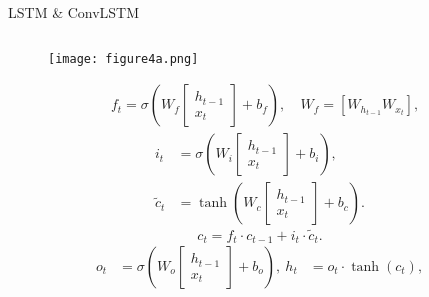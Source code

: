 \documentclass[10pt,aspectratio=169,dvipsnames]{beamer} %
\begin{document}
	\begin{frame}{LSTM \& ConvLSTM}
		\begin{columns}[T]
			\tiny
			\begin{column}[t]{0.5\textwidth}
				\begin{figure}[ht!]
					\centering
					\texttt{[image: figure4a.png]}
				\end{figure}
				\begin{tcolorbox}
					\begin{equation}
							\begin{aligned}
								&f_{t}=\sigma\left( W_{f}  
								\left[
								\begin{array}{c}
									h_{t-1} \\ x_{t}
								\end{array} 
								\right]
								+ b_{f} \right), \
								&W_{f} = \left[ W_{h_{t-1}}  W_{x_{t}} \right],
							\end{aligned}					
							\label{eq:eq1}
					\end{equation}				
					\begin{equation}
						\begin{aligned}
							i_{t} &=\sigma\left(W_{i} 
							\left[
							\begin{array}{c}
								h_{t-1} \\ x_{t}
							\end{array} 
							\right]+b_{i}\right), 
							\\ \tilde{c}_{t} &=\tanh \left(W_{c} 
							\left[
							\begin{array}{c}
								h_{t-1} \\ x_{t}
							\end{array} 
							\right]+b_{c}\right). 
						\end{aligned} \label{eq:eq2}
					\end{equation}
					\begin{equation}
						c_{t}=f_{t} \cdot c_{t-1}+i_{t} \cdot \tilde{c}_{t}.
						\label{eq:eq3}
					\end{equation}
					\begin{equation}
						\begin{aligned}
							o_{t} &=\sigma\left(W_{o} 
							\left[
							\begin{array}{c}
								h_{t-1} \\ x_{t}
							\end{array} 
							\right]
							+b_{o}\right), \
							h_{t} &=o_{t} \cdot \tanh \left(c_{t}\right),
						\end{aligned}

\end{equation}
\end{tcolorbox}
\end{column}
\end{columns}
\end{frame}
\end{document}
